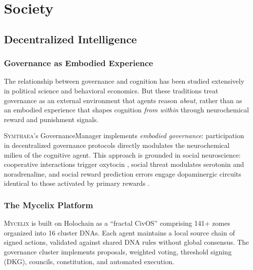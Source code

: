 \documentclass[12pt]{book}
\newcommand{\symthaea}{\textsc{Symthaea}}
\newcommand{\mycelix}{\textsc{Mycelix}}
\begin{document}
\part{Society}

\chapter{Decentralized Intelligence}
\label{ch:governance}

\section{Governance as Embodied Experience}

The relationship between governance and cognition has been studied extensively in political science and behavioral economics. But these traditions treat governance as an external environment that agents reason \textit{about}, rather than as an embodied experience that shapes cognition \textit{from within} through neurochemical reward and punishment signals.

\symthaea{}'s GovernanceManager implements \textit{embodied governance}: participation in decentralized governance protocols directly modulates the neurochemical milieu of the cognitive agent. This approach is grounded in social neuroscience: cooperative interactions trigger oxytocin \citep{kosfeld2005oxytocin}, social threat modulates serotonin and noradrenaline, and social reward prediction errors engage dopaminergic circuits identical to those activated by primary rewards \citep{schultz1997neural}.

\section{The Mycelix Platform}

\mycelix{} is built on Holochain as a ``fractal CivOS'' comprising 141+ zomes organized into 16 cluster DNAs. Each agent maintains a local source chain of signed actions, validated against shared DNA rules without global consensus. The governance cluster implements proposals, weighted voting, threshold signing (DKG), councils, constitution, and automated execution.
\end{document}

